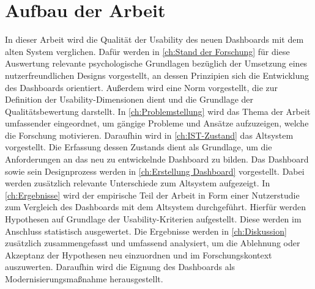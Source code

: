 \section{Aufbau der Arbeit} %
\label{sec:intro:Aufbau_der_Arbeit}
In dieser Arbeit wird die Qualität der Usability des neuen Dash\-boards mit dem alten System verglichen. Dafür werden in \autoref{ch:Stand der Forschung} für diese Auswertung relevante psychologische Grundlagen bezüglich der Umsetzung eines nutzerfreundlichen Designs vorgestellt, an dessen Prinzipien sich die Entwicklung des Dash\-boards orientiert. Außerdem wird eine Norm vorgestellt, die zur Definition der Usability-Dimensionen dient und die Grundlage der Qualitätsbewertung darstellt.
In \autoref{ch:Problemstellung} wird das Thema der Arbeit umfassender eingeordnet, um gängige Probleme und Ansätze aufzuzeigen, welche die Forschung motivieren.
Daraufhin wird in \autoref{ch:IST-Zustand} das Altsystem vorgestellt. Die Erfassung dessen Zustands dient als Grundlage, um die Anforderungen an das neu zu entwickelnde Dash\-board zu bilden. Das Dash\-board sowie sein Designprozess werden in \autoref{ch:Erstellung Dashboard} vorgestellt. Dabei werden zusätzlich relevante Unterschiede zum Altsystem aufgezeigt.
In \autoref{ch:Ergebnisse} wird der empirische Teil der Arbeit in Form einer Nutzerstudie zum Vergleich des Dash\-boards mit dem Altsystem durchgeführt. Hierfür werden Hypothesen auf Grundlage der Usability-Kriterien aufgestellt. Diese werden im Anschluss statistisch ausgewertet.
Die Ergebnisse werden in \autoref{ch:Diskussion} zusätzlich zusammengefasst und umfassend analysiert, um die Ablehnung oder Akzeptanz der Hypothesen neu einzuordnen und im Forschungskontext auszuwerten. Daraufhin wird die Eignung des Dash\-boards als Modernisierungsmaßnahme herausgestellt.





